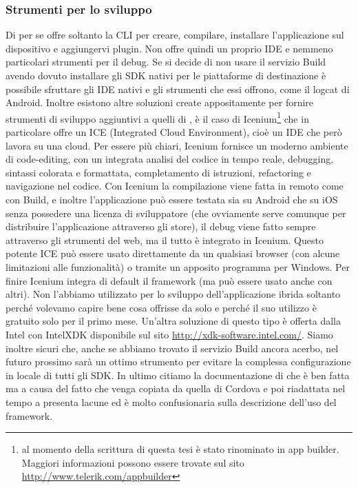 		\subsubsection{Strumenti per lo sviluppo}
		Di per se \pg{} offre soltanto la CLI per creare, compilare, 
		installare l'applicazione sul dispositivo e aggiungervi plugin. Non 
		offre quindi un proprio IDE e nemmeno particolari strumenti per il 
		debug. Se si decide di non usare il servizio \pg{} Build avendo dovuto 
		installare gli SDK nativi per le piattaforme di destinazione è 
		possibile sfruttare gli IDE nativi e gli strumenti che essi offrono, 
		come il logcat di Android. Inoltre esistono altre soluzioni create 
		appositamente per fornire strumenti di sviluppo aggiuntivi a quelli di 
		\pg{}, è il caso di Icenium\footnote{al momento della scrittura di 
		questa tesi è stato rinominato in app builder. 
		Maggiori informazioni possono essere trovate sul sito 
		\url{http://www.telerik.com/appbuilder}} che in particolare offre un 
		ICE (Integrated Cloud Environment), cioè un IDE che però lavora su una 
		cloud. Per essere più chiari, Icenium fornisce un moderno ambiente di 
		code-editing, con un integrata analisi del codice in tempo reale, 
		debugging, sintassi colorata e formattata, completamento di istruzioni, 
		refactoring e navigazione nel codice. Con Icenium la compilazione 
		viene fatta in remoto come con \pg{} Build, e inoltre l'applicazione 
		può essere testata sia su Android che su iOS senza possedere una 
		licenza di sviluppatore (che ovviamente serve comunque per distribuire 
		l'applicazione attraverso gli store), il debug viene fatto sempre 
		attraverso gli strumenti del web, ma il tutto è integrato in Icenium.
		Questo potente ICE può essere usato direttamente da un qualsiasi browser 
		(con alcune limitazioni alle funzionalità) o tramite un apposito 
		programma per Windows. Per finire Icenium integra di default il 
		framework \kendomob{} (ma può essere usato anche con altri). Non 
		l'abbiamo utilizzato per lo sviluppo dell'applicazione ibrida soltanto 
		perché volevamo capire bene cosa offrisse da solo \pg{} e perché il 
		suo utilizzo è gratuito solo per il primo mese. Un'altra soluzione di
		questo tipo è offerta dalla Intel con IntelXDK disponibile sul sito
		\url{http://xdk-software.intel.com/}. Siamo inoltre sicuri che, 
		anche se abbiamo trovato il servizio \pg{} Build ancora acerbo, nel 
		futuro prossimo sarà un ottimo strumento per evitare la complessa 
		configurazione in locale di tutti gli SDK. In ultimo citiamo la 
		documentazione di \pg{} che è ben fatta ma a causa del fatto che venga 
		copiata da quella di Cordova e poi riadattata nel tempo a \pg{} 
		presenta lacune ed è molto confusionaria sulla descrizione dell'uso 
		del framework.
		
